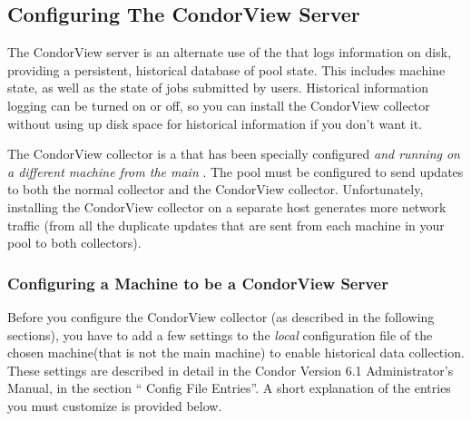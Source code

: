\subsection{\label{sec:Contrib-CondorView-Install}
Configuring The CondorView Server}

The CondorView server is an alternate use of the
that logs information on disk, providing a 
persistent, historical database of pool state.
This includes machine state, as well as the state of jobs submitted by
users.
Historical information logging can be turned on or off, so you can
install the CondorView collector without using up disk space for
historical information if you don't want it.

The CondorView collector is a  that has been specially 
configured \emph{and running on a different machine from the main
}. The pool must be configured to send updates to both
the normal collector and the CondorView collector.
Unfortunately, installing the CondorView collector on a separate host
generates more network traffic (from all the duplicate updates that
are sent from each machine in your pool to both collectors).

\subsubsection{\label{sec:CondorView-Server-Setup}
Configuring a Machine to be a CondorView Server} 

Before you configure the CondorView collector (as described in the
following sections), you have to add a few settings to the \emph{local}
configuration file of the chosen machine(that is not the main 
 machine) to enable historical data collection.
These settings are described in detail in the Condor Version 6.1
Administrator's Manual, in the section `` Config File
Entries''.
A short explanation of the entries you must customize is
provided below. 

